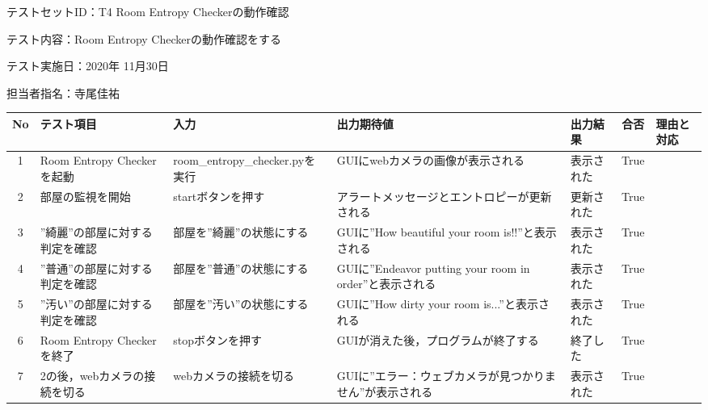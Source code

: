 テストセットID：T4 Room Entropy Checkerの動作確認

テスト内容：Room Entropy Checkerの動作確認をする

テスト実施日：2020年 11月30日

担当者指名：寺尾佳祐


\begin{table}[H]
    \centering
    \begin{tabular}{|c|p{11em}|p{11em}|p{7em}|p{6em}|c|p{5em}|} \hline
        No & テスト項目 & 入力 & 出力期待値 & 出力結果 & 合否 & 理由と対応 \\ \hline
        1 & Room Entropy Checkerを起動 & room\_entropy\_checker.pyを実行 & GUIにwebカメラの画像が表示される & 表示された & True & \\ \hline
        2 & 部屋の監視を開始 & startボタンを押す & アラートメッセージとエントロピーが更新される & 更新された & True & \\ \hline
        3 & ”綺麗”の部屋に対する判定を確認 & 部屋を”綺麗”の状態にする & GUIに”How beautiful your room is!!”と表示される & 表示された & True & \\ \hline
        4 & ”普通”の部屋に対する判定を確認 & 部屋を”普通”の状態にする & GUIに”Endeavor putting your room in order”と表示される & 表示された & True & \\ \hline
        5 & ”汚い”の部屋に対する判定を確認 & 部屋を”汚い”の状態にする & GUIに”How dirty your room is...”と表示される & 表示された & True & \\ \hline
        6 & Room Entropy Checkerを終了 & stopボタンを押す & GUIが消えた後，プログラムが終了する & 終了した & True & \\ \hline
        7 & 2の後，webカメラの接続を切る & webカメラの接続を切る & GUIに”エラー：ウェブカメラが見つかりません”が表示される & 表示された & True & \\ \hline
    \end{tabular}
    \label{tab:test_set1}
\end{table}